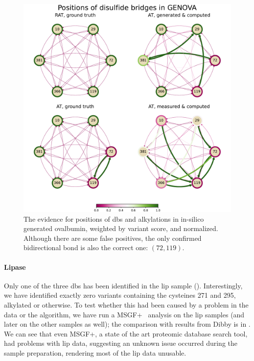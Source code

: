 \begin{figure}
  \centering
  \includegraphics[width=0.9\linewidth]{img/genova.pdf}
  \caption{The evidence for positions of \glspl*{db} and alkylations in in-silico generated ovalbumin, weighted by variant score, and normalized. Although there are some false positives, the only confirmed bidirectional bond is also the correct one: \((72, 119)\).}\label{fig:genova}
\end{figure}

\paragraph{Lipase} Only one of the three \glspl*{db} has been identified in the \gls*{lip} sample (). Interestingly, we have identified exactly zero variants containing the cysteines 271 and 295, alkylated or otherwise. To test whether this had been caused by a problem in the data or the algorithm, we have run a MSGF+~\cite{kim2014ms} analysis on the \gls*{lip} samples (and later on the other samples as well); the comparison with results from Dibby is in . We can see that even MSGF+, a state of the art proteomic database search tool, had problems with \gls*{lip} data, suggesting an unknown issue occurred during the sample preparation, rendering most of the \gls*{lip} data unusable.

